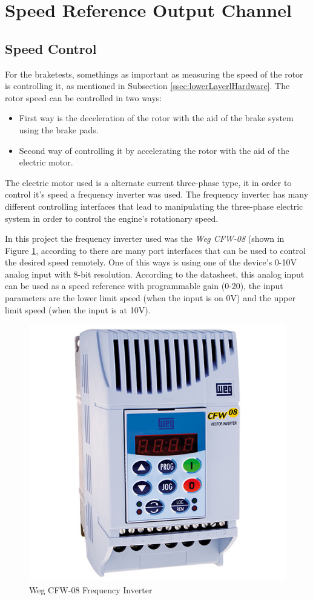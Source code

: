 	\section{Speed Reference Output Channel}\label{sec:speed-reference-output-channel}

	\subsection{Speed Control}\label{ssec:speed-control}
		\par
		For the braketests, somethings as important as measuring the speed of the rotor is controlling it, as mentioned in Subsection \ref{ssec:lowerLayerlHardware}. The rotor speed can be controlled in two ways:
			\begin{itemize}
				\item First way is the deceleration of the rotor with the aid of the brake system using the brake pads.
				\item Second way of controlling it by accelerating the rotor with the aid of the electric motor.
			\end{itemize}
		The electric motor used is a alternate current three-phase type, it in order to control it's speed a frequency inverter was used. The frequency inverter has many different controlling interfaces that lead to manipulating the three-phase electric system in order to control the engine's rotationary speed.
		\par
		In this project the frequency inverter used was the \textit{Weg CFW-08} (shown in Figure \ref{fig:wegCFW08}, according to \cite{wegCFW08Manual} there are many port interfaces that can be used to control the desired speed remotely. One of this ways is using one of the device's 0-10V analog input with 8-bit resolution. According to the datasheet, this analog input can be used as a speed reference with programmable gain (0-20), the input parameters are the lower limit speed (when the input is on 0V) and the upper limit speed (when the input is at 10V).

		\begin{figure}[htbp]
			\centering
				\includegraphics[width=.5\textwidth]{figuras/fig-wegCFW08}
			\caption{Weg CFW-08 Frequency Inverter \cite{fig-wegCFW08}}
			\label{fig:wegCFW08}
		\end{figure}

